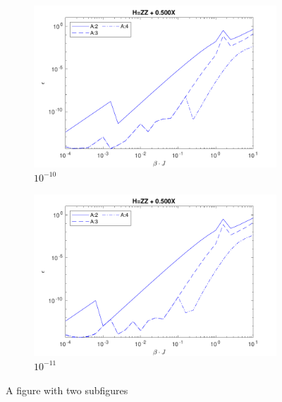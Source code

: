 \begin{figure}
    \centering
    \begin{subfigure}{\textwidth}
        \centering
        \includegraphics[width=0.8\linewidth]{Figuren/mpo_construction/sigm0/e10.pdf}
        \caption{ ${10}^{-10}$}
        \label{fig:sub1}
    \end{subfigure}%

    \begin{subfigure}{\textwidth}
        \centering
        \includegraphics[width=0.8\linewidth]{Figuren/mpo_construction/sigm0/e11.pdf}
        \caption{${10}^{-11}$}
        \label{fig:sub2}
    \end{subfigure}
    \caption{A figure with two subfigures}
    \label{fig:sigman0}
\end{figure}

